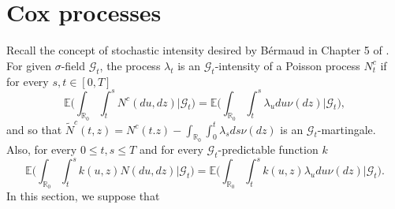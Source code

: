 \documentclass[11pt]{article}
\numberwithin{equation}{section}
\begin{document}
\section{Cox processes}
Recall the concept of stochastic intensity desired by B{\'e}rmaud in Chapter 5 of \cite{bremaud}. 
For given  $\sigma$-field $\mathcal{G}_t$, the process $\lambda_t$ is an $\mathcal{G}_t$-intensity of a Poisson process $N^c_t$ if for every $s,t \in [0,T]$
\begin{equation*} 
	\mathbb{E}\Big(\int_{\mathbb{R}_0}\int_t^s  N^c(du,dz)\vert \mathcal{G}_t\Big)=\mathbb{E}\Big(\int_{\mathbb{R}_0}\int_t^s \lambda_u du\nu(dz)\vert \mathcal{G}_t\Big),
\end{equation*}
and so that  $\tilde{N}^c(t,z)=N^c(t.z)-\int_{\mathbb{R}_0}\int_0^t\lambda_sds\nu(dz)$  is an $\mathcal{G}_t$-martingale. Also, for every $0 \leq t,s \leq T$ and for every $\mathcal{G}_t$-predictable function $k$  
\begin{equation*} 
	\mathbb{E}\Big(\int_{\mathbb{R}_0}\int_t^s k(u,z) N(du,dz)\vert  \mathcal{G}_t \Big)=\mathbb{E}\Big(\int_{\mathbb{R}_0}\int_t^s k(u,z)\lambda_u du\nu(dz)\vert  \mathcal{G}_t \Big). 
\end{equation*}
In this section, we suppose that 
\end{document}
